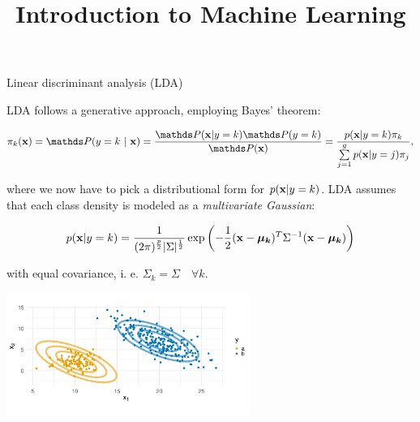 \documentclass[11pt,compress,t,notes=noshow, xcolor=table]{beamer}
\title{Introduction to Machine Learning}
\begin{document}

\begin{vbframe}{Linear discriminant analysis (LDA)}

\begin{small}
LDA follows a generative approach, employing Bayes' theorem:

$$\pikx = \postk = \frac{\P(\xv | y = k) \P(y = k)}{\P(\xv)} = \frac{\pdfxyk \pik}{\sumjg \pdfxyk[j] \pi_j},$$

where we now have to pick a distributional form for $p(\mathbf{x} | y= k)$. LDA assumes that each class density is modeled as a \emph{multivariate Gaussian}:

$$
p(\mathbf{x} | y= k) = \frac{1}{(2\pi)^{\frac{p}{2}}|\Sigma|^{\frac{1}{2}}} \exp\left(-\frac{1}{2}(\mathbf{x} - \bm{\mu_{k}})^T \Sigma^{-1} (\mathbf{x} - \bm{\mu_{k}})\right)
$$

with equal covariance, i. e. $\Sigma_k = \Sigma \quad \forall k$.
\end{small}


\vspace{-0.9em}
\begin{center}
\includegraphics[width=0.60\textwidth, clip=true, trim={0 75 0 45}]{figure/disc_analysis-lda_1.png}
\end{center}
\end{vbframe}
\end{document}
